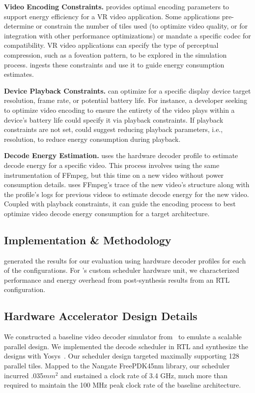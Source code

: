 \textbf{Video Encoding Constraints. } \nameArchprof provides optimal encoding parameters to support energy efficiency for a VR video application.
Some applications pre-determine or constrain the number of tiles used (to optimize video quality, or for integration with other performance optimizations) or mandate a specific codec for compatibility.
VR video applications can specify the type of perceptual compression, such as a foveation pattern, to be explored in the simulation process.
\nameArchprof ingests these constraints and use it to guide energy consumption estimates.

\textbf{Device Playback Constraints. } \nameArchprof can optimize for a specific display device target resolution, frame rate, or potential battery life.
For instance, a developer seeking to optimize video encoding to ensure the entirety of the video plays within a device's battery life could specify it via playback constraints.
If playback constraints are not set, \nameArchprof could suggest reducing playback parameters, i.e., resolution, to reduce energy consumption during playback.

\textbf{Decode Energy Estimation. } \nameArchprof uses the hardware decoder profile to estimate decode energy for a specific video.
This process involves using the same instrumentation of {FFmpeg}, but this time on a new video without power consumption details.
\nameArchprof uses {FFmpeg}'s trace of the new video's structure along with the profile's logs for previous videos to estimate decode energy for the new video.
Coupled with playback constraints, it can guide the encoding process to best optimize video decode energy consumption for a target architecture.

\subsection{\nameArchprof Implementation \& Methodology}
\nameArchprof generated the results for our evaluation using hardware decoder profiles for each of the \nameArch configurations.
For \nameArch's custom scheduler hardware unit, we characterized performance and energy overhead from post-synthesis results from an RTL configuration.

\subsection{Hardware Accelerator Design Details}
We constructed a baseline video decoder simulator from~\cite{hevcThesis} to emulate a scalable parallel design.
We implemented the \nameArch decode scheduler in RTL and synthesize the designs with Yosys~\cite{yosys}.
Our scheduler design targeted maximally supporting 128 parallel tiles.
Mapped to the Nangate FreePDK45nm library, our scheduler incurred .035$mm^2$ and sustained a clock rate of 3.4 GHz, much more than required to maintain the 100 MHz peak clock rate of the baseline architecture.

